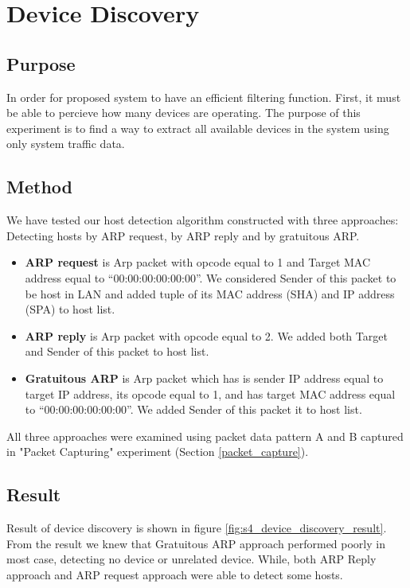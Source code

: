 \section{Device Discovery}
\subsection{Purpose}
In order for proposed system to have an efficient filtering function. First,
it must be able to percieve how many devices are operating.
The purpose of this experiment is to find a way to extract all available devices in the system using only 
system traffic data.

\subsection{Method}
We have tested our host detection algorithm constructed with three approaches: Detecting hosts by ARP request, by ARP reply and by gratuitous ARP.
\begin{itemize}
    \item \textbf{ARP request} is Arp packet with opcode equal to 1 and Target MAC address equal to “00:00:00:00:00:00”. We considered Sender of this packet to be host in LAN and added tuple of its MAC address (SHA) and IP address (SPA) to host list.
    \item \textbf{ARP reply} is Arp packet with opcode equal to 2. We added both Target and Sender of this packet to host list. 
    \item \textbf{Gratuitous ARP} is Arp packet which has is sender IP address equal to target IP address, its opcode equal to 1, and has target MAC address equal to “00:00:00:00:00:00”. We added Sender of this packet it to host list.  
\end{itemize}

All three approaches were examined using packet data pattern A and B captured in "Packet Capturing" experiment (Section \ref{packet_capture}). 
 
\subsection{Result}
Result of device discovery is shown in figure \ref{fig:s4_device_discovery_result}. From the result we knew that Gratuitous ARP approach performed poorly in most case, detecting no device or unrelated device. While, both ARP Reply approach and ARP request approach were able to detect some hosts.

